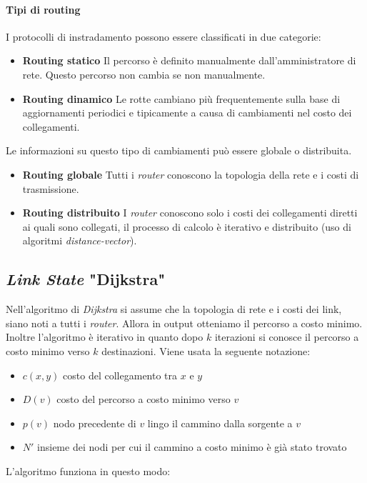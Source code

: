     \paragraph{Tipi di routing}
        I protocolli di instradamento possono essere classificati in due categorie: \begin{itemize}
            \item \textbf{Routing statico} Il percorso è definito manualmente dall'amministratore di rete. Questo percorso non cambia se non manualmente.
            \item \textbf{Routing dinamico} Le rotte cambiano più frequentemente sulla base di aggiornamenti periodici e tipicamente a causa di cambiamenti nel costo dei collegamenti.
        \end{itemize}
        Le informazioni su questo tipo di cambiamenti può essere globale o distribuita.
        \begin{itemize}
            \item \textbf{Routing globale} Tutti i \textit{router} conoscono la topologia della rete e i costi di trasmissione.
            \item \textbf{Routing distribuito} I \textit{router} conoscono solo i costi dei collegamenti diretti ai quali sono collegati, il processo di calcolo è iterativo e distribuito (uso di algoritmi \textit{distance-vector}).
        \end{itemize}
    \subsection{\textit{Link State} "Dijkstra"}
        Nell'algoritmo di \textit{Dijkstra} si assume che la topologia di rete e i costi dei link, siano noti a tutti i \textit{router}. Allora in output otteniamo il percorso a costo minimo. Inoltre l'algoritmo è iterativo in quanto dopo $k$ iterazioni si conosce il percorso a costo minimo verso $k$ destinazioni.\newline
        Viene usata la seguente notazione: \begin{itemize}
            \item $c(x,y)$ costo del collegamento tra $x$ e $y$
            \item $D(v)$ costo del percorso a costo minimo verso $v$
            \item $p(v)$ nodo precedente di $v$ lingo il cammino dalla sorgente a $v$
            \item $N'$ insieme dei nodi per cui il cammino a costo minimo è già stato trovato
        \end{itemize}\newpage
        L'algoritmo funziona in questo modo:

